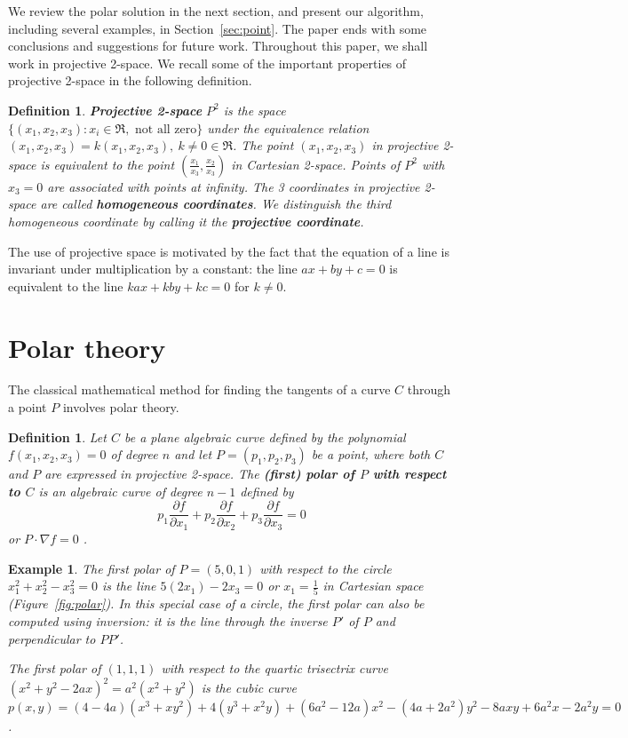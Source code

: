 \documentclass[twocolumn,10pt]{article}
\newtheorem{example}[theorem]{Example}
\newtheorem{defn2}[theorem]{Definition}
\begin{document}
We review the polar solution in the next section,
and present our algorithm, including several examples, 
in Section~\ref{sec:point}.
The paper ends with some conclusions and suggestions for future work.
Throughout this paper, we shall work in projective 2-space.
We recall some of the important properties of projective 2-space 
in the following definition.

\begin{defn2}
\label{defn:proj}
{\bf Projective 2-space} $P^2$ is the space 
$\{(x_1,x_2,x_3) : x_i \in \Re, \mbox{ not all zero}\}$
under the equivalence relation $(x_1,x_2,x_3) = k(x_1,x_2,x_3),\ k \neq 0 \in \Re$.
The point $(x_1,x_2,x_3)$ in projective 2-space
is equivalent to the point $(\frac{x_1}{x_3},\frac{x_2}{x_3})$
in Cartesian 2-space.
Points of $P^2$ with $x_3=0$ are associated with points at infinity.
The 3 coordinates in projective 2-space are called {\bf homogeneous coordinates}.
We distinguish the third homogeneous coordinate by calling it the 
{\bf projective coordinate}.
\end{defn2}

The use of projective space is motivated by the fact that the equation 
of a line is invariant under multiplication by a constant:
the line $ax+by+c=0$ is equivalent to the line $kax+kby+kc=0$ 
for $k \neq 0$.

\section{Polar theory}
\label{sec:polar}

The classical mathematical method for finding the tangents of a curve $C$
through a point $P$ involves polar theory.

\begin{defn2}
Let $C$ be a plane algebraic curve defined by the polynomial $f(x_1,x_2,x_3)=0$
of degree $n$ and let $P = (p_1,p_2,p_3)$ be a point, where both $C$ and $P$ 
are expressed in projective 2-space.
The {\bf (first) polar of $P$ with respect to $C$} 
is an algebraic curve of degree $n-1$ defined by
\[
	p_1 \frac{\partial f}{\partial x_1} +
	p_2 \frac{\partial f}{\partial x_2} +
	p_3 \frac{\partial f}{\partial x_3} = 0
\]
or $P \cdot \nabla f = 0$ \cite{semple85}.	%
\end{defn2}

\begin{example}
The first polar of $P=(5,0,1)$ with respect to the circle 
$x_1^2 + x_2^2 - x_3^2 = 0$ is the line
$5(2x_1) - 2x_3 = 0$ or $x_1 = \frac{1}{5}$ in Cartesian space
(Figure~\ref{fig:polar}).
In this special case of a circle, the first polar can also be computed
using inversion: it is the line through the inverse $P'$ of $P$ 
and perpendicular to $PP'$.

The first polar of $(1,1,1)$ with respect to the quartic trisectrix curve
$(x^2 + y^2 - 2ax)^2 = a^2(x^2 + y^2)$ \cite{lawrence72} %
is the cubic curve $p(x,y) = 
(4-4a)(x^3 + xy^2) + 4(y^3 + x^2y) + (6a^2 - 12a)x^2 - (4a+2a^2)y^2 - 8axy + 6a^2x - 2a^2y = 0$.
\end{example}
\end{document}
